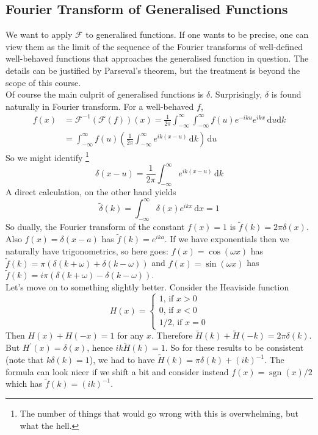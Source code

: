 \subsection{Fourier Transform of Generalised Functions}
We want to apply $\mathcal F$ to generalised functions.
If one wants to be precise, one can view them as the limit of the sequence of the Fourier transforms of well-defined well-behaved functions that approaches the generalised function in question.
The details can be justified by Parseval's theorem, but the treatment is beyond the scope of this course.\\
Of course the main culprit of generalised functions is $\delta$.
Surprisingly, $\delta$ is found naturally in Fourier transform.
For a well-behaved $f$,
\begin{align*}
    f(x)&=\mathcal F^{-1}(\mathcal F(f))(x)=\frac{1}{2\pi}\int_{-\infty}^\infty\int_{-\infty}^\infty f(u)e^{-iku}e^{ikx}\,\mathrm du\mathrm dk\\
    &=\int_{-\infty}^\infty f(u)\left( \frac{1}{2\pi}\int_{-\infty}^\infty e^{ik(x-u)}\,\mathrm dk \right)\,\mathrm du
\end{align*}
So we might identify
\footnote{The number of things that would go wrong with this is overwhelming, but what the hell.}
$$\delta(x-u)=\frac{1}{2\pi}\int_{-\infty}^\infty e^{ik(x-u)}\,\mathrm dk$$
A direct calculation, on the other hand yields
$$\tilde\delta(k)=\int_{-\infty}^\infty \delta(x)e^{ikx}\,\mathrm dx=1$$
So dually, the Fourier transform of the constant $f(x)=1$ is $\tilde{f}(k)=2\pi\delta(x)$.
Also $f(x)=\delta(x-a)$ has $\tilde{f}(k)=e^{ika}$.
If we have exponentials then we naturally have trigonometrics, so here goes:
$f(x)=\cos(\omega x)$ has $\tilde{f}(k)=\pi(\delta(k+\omega)+\delta(k-\omega))$ and $f(x)=\sin(\omega x)$ has $\tilde{f}(k)=i\pi (\delta(k+\omega)-\delta(k-\omega))$.\\
Let's move on to something slightly better.
Consider the Heaviside function
$$H(x)=\begin{cases}
    1\text{, if $x>0$}\\
    0\text{, if $x<0$}\\
    1/2\text{, if $x=0$}
\end{cases}$$
Then $H(x)+H(-x)=1$ for any $x$.
Therefore $\tilde{H}(k)+\tilde{H}(-k)=2\pi\delta(k)$.
But $H^\prime(x)=\delta(x)$, hence $ik\tilde{H}(k)=1$.
So for these results to be consistent (note that $k\delta(k)=1$), we had to have $\tilde{H}(k)=\pi\delta(k)+(ik)^{-1}$.
The formula can look nicer if we shift a bit and consider instead $f(x)=\operatorname{sgn}(x)/2$ which has $\tilde{f}(k)=(ik)^{-1}$.
